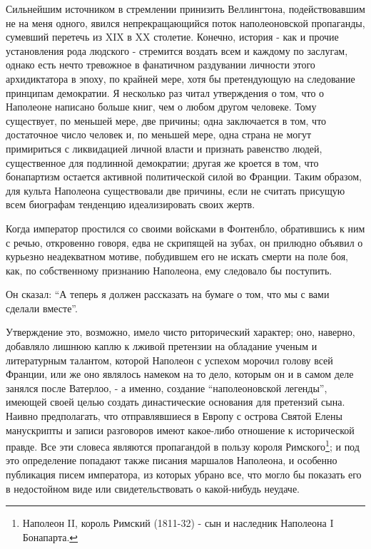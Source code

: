 \documentclass[
  oneside,
  12pt,
  titlepage]{book}
\begin{document}
Сильнейшим источником в стремлении принизить Веллингтона, подействовавшим не на меня одного, явился непрекращающийся поток наполеоновской пропаганды, сумевший перетечь из XIX в XX столетие. Конечно, история - как и прочие установления рода людского - стремится воздать всем и каждому по заслугам, однако есть нечто тревожное в фанатичном раздувании личности этого архидиктатора в эпоху, по крайней мере, хотя бы претендующую на следование принципам демократии. Я несколько раз читал утверждения о том, что о Наполеоне написано больше книг, чем о любом другом человеке. Тому существует, по меньшей мере, две причины; одна заключается в том, что достаточное число человек и, по меньшей мере, одна страна не могут примириться с ликвидацией личной власти и признать равенство людей, существенное для подлинной демократии; другая же кроется в том, что бонапартизм остается активной политической силой во Франции. Таким образом, для культа Наполеона существовали две причины, если не считать присущую всем биографам тенденцию идеализировать своих жертв.

Когда император простился со своими войсками в Фонтенбло, обратившись к ним с речью, откровенно говоря, едва не скрипящей на зубах, он прилюдно объявил о курьезно неадекватном мотиве, побудившем его не искать смерти на поле боя, как, по собственному признанию Наполеона, ему следовало бы поступить.

Он сказал: ``А теперь я должен рассказать на бумаге о том, что мы с вами сделали вместе''.

Утверждение это, возможно, имело чисто риторический характер; оно, наверно, добавляло лишнюю каплю к лживой претензии на обладание ученым и литературным талантом, которой Наполеон с успехом морочил голову всей Франции, или же оно являлось намеком на то дело, которым он и в самом деле занялся после Ватерлоо, - а именно, создание ``наполеоновской легенды'', имеющей своей целью создать династические основания для претензий сына. Наивно предполагать, что отправлявшиеся в Европу с острова Святой Елены манускрипты и записи разговоров имеют какое-либо отношение к исторической правде. Все эти словеса являются пропагандой в пользу короля Римского\footnote{Наполеон II, король Римский (1811-32) - сын и наследник Наполеона I Бонапарта.}; и под это определение попадают также писания маршалов Наполеона, и особенно публикация писем императора, из которых убрано все, что могло бы показать его в недостойном виде или свидетельствовать о какой-нибудь неудаче.
\end{document}
